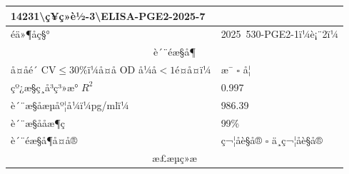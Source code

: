 \documentclass[UTF8,10pt,a4paper,fontset=fandol]{ctexart}
\newcommand{\fieldvalue}[1]{#1}
\newcommand{\handwritten}[1]{#1}
\begin{document}
\begin{tabularx}{\textwidth}{|p{}|X|}
\fieldvalue{\handwritten{14231\textbackslash ç¥ç»è½-3\textbackslash ELISA-PGE2-2025-7}}\\
\hline
éä»¶åç§° &
\fieldvalue{\handwritten{2025\ 530-PGE2-1ï¼è¡¨2ï¼}}\\
\hline
\multicolumn{2}{|c|}{è´¨éæ§å¶}\\
\hline
å¤å­é´ CV$\leq 30\%$ï¼å¤å­ OD å¼å$<1$é¤å¤ï¼ &
\fieldvalue{\handwritten{\checkmark}} æ¯ \quad $\square$ å¦\\
\hline
çº¿æ§ç¸å³ç³»æ° $R^2$ &
\fieldvalue{\handwritten{0.997}}\\
\hline
è´¨æ§åæµåº¦å¼ï¼pg/mlï¼ &
\fieldvalue{\handwritten{986.39}}\\
\hline
è´¨æ§ååæ¶ç &
\fieldvalue{\handwritten{99\%}}\\
\hline
è´¨éæ§å¶å¤å® &
\fieldvalue{\handwritten{\checkmark}} ç¬¦åè§å®
\quad $\square$ ä¸ç¬¦åè§å®\\
\hline
\multicolumn{2}{|c|}{æ£æµç»æ}\\
\hline
\end{tabularx}
\end{document}
